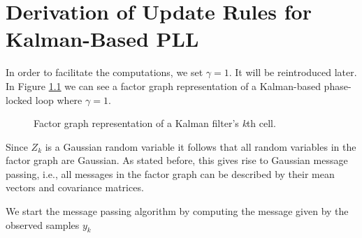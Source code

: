 \documentclass[11pt,a4paper,twoside]{report}
\begin{document}
\chapter{Derivation of Update Rules for Kalman-Based PLL}

In order to facilitate the computations, we set $\gamma=1$. It will be reintroduced later. In Figure \ref{factor_graph} we can see a factor graph representation of a Kalman-based phase-locked loop where $\gamma = 1$.

\begin{figure}[h]
	\centering

  	\caption[Factor graph representation of a Kalman filter's \textit{k}th cell.]
   	{Factor graph representation of a Kalman filter's \textit{k}th cell.}
	\label{factor_graph}
\end{figure}

Since $Z_k$ is a Gaussian random variable it follows that all random variables in the factor graph are Gaussian. As stated before, this gives rise to Gaussian message passing, i.e., all messages in the factor graph can be described by their mean vectors and covariance matrices.

We start the message passing algorithm by computing the message given by the observed samples $y_k$ \cite{SIP}
\end{document}
